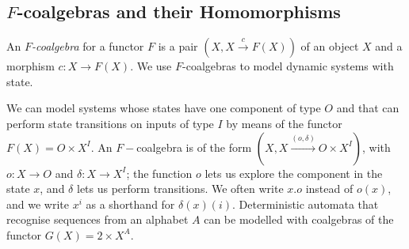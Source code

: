 \subsection{$F$-coalgebras and their Homomorphisms}
An \emph{$F$-coalgebra} for a functor $F$ is a pair $(X,X\xrightarrow{c}F(X))$ of an object $X$ and a morphism $c\colon X\rightarrow F(X)$. We use $F$-coalgebras to model dynamic systems with state. 
\begin{example}
We can model systems whose states have one component of type $O$ and that can perform state transitions on inputs of type $I$ by means of the functor $F(X)=O\times X^I$. An $F-$coalgebra is of the form $(X,X\xrightarrow{(o,\delta)}O\times X^I)$, with $o\colon X\rightarrow O$ and $\delta\colon X\rightarrow X^I$; the function $o$ lets us explore the component in the state $x$, and $\delta$ lets us perform transitions. We often write $x.o$ instead of $o(x)$, and we write $x^i$ as a shorthand for $\delta(x)(i)$. Deterministic automata that recognise sequences from an alphabet $A$ can be modelled with coalgebras of the functor $G(X)=2\times X^A$.
\end{example}
%
